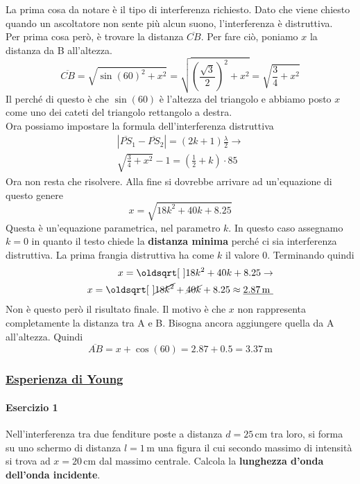 La prima cosa da notare è il tipo di interferenza richiesto. Dato che viene chiesto quando un 
ascoltatore non sente più alcun suono, l'interferenza è distruttiva.\\
Per prima cosa però, è trovare la distanza $\overline{CB}$. Per fare ciò, poniamo $x$ la distanza
da B all'altezza.
\begin{equation*}
  \overline{CB} = \sqrt{\sin(60)^2 + x^2} = \sqrt{\left(\frac{\sqrt{3}}{2}\right)^2 +
  x^2} = \sqrt{\frac{3}{4} + x^2}
\end{equation*}
Il perché di questo è che $\sin(60)$ è l'altezza del triangolo e abbiamo posto $x$ come uno dei
cateti del triangolo rettangolo a destra.\\
Ora possiamo impostare la formula dell'interferenza distruttiva
\begin{align*}
  \left\lvert \overline{PS}_1-\overline{PS}_2 \right\rvert = 
  (2k + 1)\frac{\lambda}{2} \rightarrow \\
  \sqrt{\frac{3}{4} + x^2} - 1 = \left(\frac{1}{2}+k\right)\cdot85
\end{align*}
Ora non resta che risolvere. Alla fine si dovrebbe arrivare ad un'equazione di questo genere
\begin{equation*}
  x = \sqrt{18k^2 + 40k + 8.25}
\end{equation*}
Questa è un'equazione parametrica, nel parametro $k$. In questo caso assegnamo $k = 0$ in quanto il
testo chiede la \textbf{distanza minima} perché ci sia interferenza distruttiva. La prima frangia
distruttiva ha come $k$ il valore $0$. Terminando quindi
\begin{align*}
  x = \sqrt{18k^2 + 40k + 8.25} \rightarrow \\
  x = \sqrt{\cancel{18k^2} + \cancel{40k} + 8.25} \approx
  \underline{2.87\,\text{m	}}
\end{align*}
Non è questo però il risultato finale. Il motivo è che $x$ non rappresenta completamente la
distanza tra A e B. Bisogna ancora aggiungere quella da A all'altezza. Quindi
\begin{equation*}
  \overline{AB} = x + \cos(60) = 2.87 + 0.5 = \boxed{3.37\,\text{m}}
\end{equation*}

\subsubsection*{\hyperref[subsec:onde:young]{Esperienza di Young}}\label{ex:young}
\paragraph{Esercizio 1}
Nell'interferenza tra due fenditure poste a distanza $d = 25\,\text{cm}$ tra loro, si forma su uno 
schermo di distanza $l = 1\,\text{m}$ una figura il cui secondo massimo di intensità si trova ad $x = 
20\,\text{cm}$ dal massimo centrale. Calcola la \textbf{lunghezza d'onda dell'onda incidente}.
\divisor

